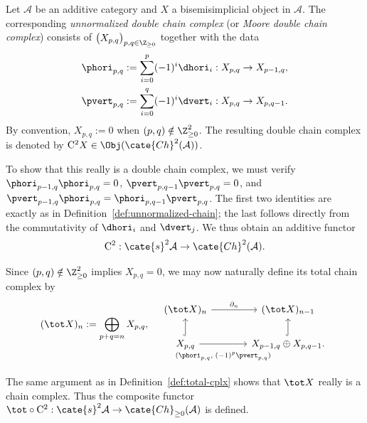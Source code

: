 \begin{definition}
	Let $\mathcal{A}$ be an additive category and $X$ a bisemisimplicial
	object in $\mathcal{A}$. The corresponding \emph{unnormalized double
	chain complex} (or \emph{Moore double chain complex}) consists of
	$\bigl(X_{p,q}\bigr)_{p,q\in\Z_{\geq0}}$ together with the data
	\begin{align*}
		\phori_{p, q} & := \sum_{i=0}^p (-1)^i \dhori_i: X_{p, q} \to X_{p-1, q}, \\
		\pvert_{p, q} & := \sum_{i=0}^q (-1)^i \dvert_i: X_{p, q} \to X_{p, q-1}.
	\end{align*}
	By convention, $X_{p,q}:=0$ when $(p,q)\notin\Z_{\geq0}^2$. The
	resulting double chain complex is denoted by
	$\mathrm{C}^2X\in\Obj(\cate{Ch}^2(\mathcal{A}))$.
\end{definition}

To show that this really is a double chain complex, we must verify
$\phori_{p-1,q}\phori_{p,q}=0$,
$\pvert_{p,q-1}\pvert_{p,q}=0$, and
$\pvert_{p-1,q}\phori_{p,q}=\phori_{p,q-1}\pvert_{p,q}$. The first two
identities are exactly as in Definition~\ref{def:unnormalized-chain}; the
last follows directly from the commutativity of $\dhori_i$ and $\dvert_j$.
We thus obtain an additive functor
\[ \mathrm{C}^2: \cate{s}^2 \mathcal{A} \to \cate{Ch}^2(\mathcal{A}). \]

Since $(p,q)\notin\Z_{\geq0}^2$ implies $X_{p,q}=0$, we may now naturally
define its total chain complex by
\[ (\tot X)_n := \bigoplus_{p+q = n} X_{p, q}, \quad
\begin{tikzcd}[column sep=large]
	(\tot X)_n \arrow[r, "{\partial_n}"] & (\tot X)_{n-1} \\
	X_{p,q} \arrow[hookrightarrow, u] \arrow[r, "{(\phori_{p, q}, \; (-1)^p \pvert_{p, q})}"' inner sep=0.8em] & X_{p-1, q} \oplus X_{p, q-1} . \arrow[hookrightarrow, u]
\end{tikzcd}\]
The same argument as in Definition~\ref{def:total-cplx} shows that $\tot X$
really is a chain complex. Thus the composite functor
$\tot\circ\mathrm{C}^2:\cate{s}^2\mathcal{A}\to
\cate{Ch}_{\geq0}(\mathcal{A})$ is defined.

